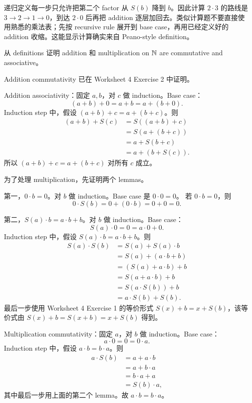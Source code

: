 \begin{explanation}
递归定义每一步只允许把第二个 factor 从 \(S(b)\) 降到 \(b\)。因此计算
\(2\cdot3\) 的路线是 \(3\to2\to1\to0\)，到达 \(2\cdot0\) 后再把 addition
逐层加回去。类似计算题不要直接使用熟悉的乘法表；先按 recursive rule 展开到
base case，再用已经定义好的 addition 收缩。这能显示计算确实来自 Peano-style
definition。
\end{explanation}

\begin{exerciseblock}
从 definitions 证明 addition 和 multiplication on \(\mathbb{N}\) are commutative and
associative。
\end{exerciseblock}

\begin{solution}
Addition commutativity 已在 Worksheet 4 Exercise 2 中证明。

Addition associativity：固定 \(a,b\)，对 \(c\) 做 induction。Base case：
\[
  (a+b)+0=a+b=a+(b+0).
\]
Induction step 中，假设 \((a+b)+c=a+(b+c)\)。则
\[
\begin{aligned}
(a+b)+S(c)
  &=S((a+b)+c)\\
  &=S(a+(b+c))\\
  &=a+S(b+c)\\
  &=a+(b+S(c)).
\end{aligned}
\]
所以 \((a+b)+c=a+(b+c)\) 对所有 \(c\) 成立。

为了处理 multiplication，先证明两个 lemmas。

第一，\(0\cdot b=0\)。对 \(b\) 做 induction。Base case 是 \(0\cdot0=0\)。
若 \(0\cdot b=0\)，则
\[
0\cdot S(b)=0+(0\cdot b)=0+0=0.
\]

第二，\(S(a)\cdot b=a\cdot b+b\)。对 \(b\) 做 induction。Base case：
\[
S(a)\cdot0=0=a\cdot0+0.
\]
Induction step 中，假设 \(S(a)\cdot b=a\cdot b+b\)。则
\[
\begin{aligned}
S(a)\cdot S(b)
  &=S(a)+S(a)\cdot b\\
  &=S(a)+(a\cdot b+b)\\
  &=(S(a)+a\cdot b)+b\\
  &=S(a+a\cdot b)+b\\
  &=S(a\cdot S(b))+b\\
  &=a\cdot S(b)+S(b).
\end{aligned}
\]
最后一步使用 Worksheet 4 Exercise 1 的等价形式 \(S(x)+b=x+S(b)\)，该等价式由
\(S(x)+b=S(x+b)=x+S(b)\) 得到。

Multiplication commutativity：固定 \(a\)，对 \(b\) 做 induction。Base case：
\[
  a\cdot0=0=0\cdot a.
\]
Induction step 中，假设 \(a\cdot b=b\cdot a\)。则
\[
\begin{aligned}
a\cdot S(b)
  &=a+a\cdot b\\
  &=a+b\cdot a\\
  &=b\cdot a+a\\
  &=S(b)\cdot a,
\end{aligned}
\]
其中最后一步用上面的第二个 lemma。故 \(a\cdot b=b\cdot a\)。


\end{solution}
